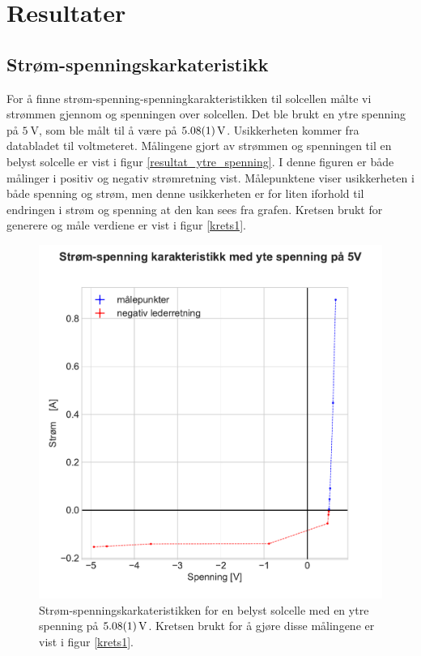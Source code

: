 \documentclass[%
 reprint,
 amsmath,amssymb,
 aps,
 norsk,
 booktabs
]{revtex4-1}
\begin{document}
\section{Resultater}
\subsection{Strøm-spenningskarkateristikk}
For å finne strøm-spenning-spenningkarakteristikken til solcellen målte vi strømmen gjennom og spenningen over solcellen. Det ble brukt en ytre spenning på $\SI{5}{\volt}$, som ble målt til å være på $\SI{5.08\pm0.01}{\volt}$. Usikkerheten kommer fra databladet til voltmeteret. Målingene gjort av strømmen og spenningen til en belyst solcelle er vist i figur \vref{resultat_ytre_spenning}. I denne figuren er både målinger i positiv og negativ strømretning vist. Målepunktene viser usikkerheten i både spenning og strøm, men denne usikkerheten er for liten iforhold til endringen i strøm og spenning at den kan sees fra grafen. Kretsen brukt for generere og måle verdiene er vist i figur \vref{krets1}. \\
\begin{figure}
  \centering
  \includegraphics[scale=0.47]{ytre_spenning.pdf}
  \caption{Strøm-spenningskarkateristikken for en belyst solcelle med en ytre spenning på $\SI{5.08\pm0.01}{\volt}$. Kretsen brukt for å gjøre disse målingene er vist i figur \vref{krets1}.}
  \label{resultat_ytre_spenning}
\end{figure}
\end{document}
